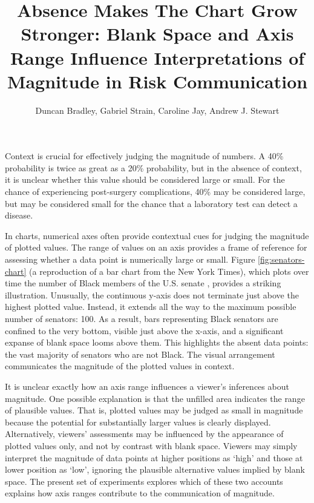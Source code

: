 \documentclass[journal]{vgtc}                %
\title{Absence Makes The Chart Grow Stronger: Blank Space and Axis Range Influence Interpretations of Magnitude in Risk Communication}
\author{Duncan Bradley, Gabriel Strain, Caroline Jay, Andrew J. Stewart}
\begin{document}


\maketitle


{Context is crucial for effectively judging the magnitude of numbers. A 40\% probability is twice as great as a 20\% probability, but in the absence of context, it is unclear whether this value should be considered large or small. For the chance of experiencing post-surgery complications, 40\% may be considered large, but may be considered small for the chance that a laboratory test can detect a disease.

In charts, numerical axes often provide contextual cues for judging the magnitude of plotted values. The range of values on an axis provides a frame of reference for assessing whether a data point is numerically large or small. Figure \ref{fig:senators-chart} (a reproduction of a bar chart from the New York Times), which plots over time the number of Black members of the U.S. senate \citep{history_art__archives_us_house_of_representatives_office_of_the_historian_black-american_nodate}, provides a striking illustration. Unusually, the continuous y-axis does not terminate just above the highest plotted value. Instead, it extends all the way to the maximum possible number of senators: 100. As a result, bars representing Black senators are confined to the very bottom, visible just above the x-axis, and a significant expanse of blank space looms above them. This highlights the absent data points: the vast majority of senators who are not Black. The visual arrangement communicates the magnitude of the plotted values in context.

It is unclear exactly how an axis range influences a viewer's inferences about magnitude. One possible explanation is that the unfilled area indicates the range of plausible values. That is, plotted values may be judged as small in magnitude because the potential for substantially larger values is clearly displayed. Alternatively, viewers' assessments may be influenced by the appearance of plotted values only, and not by contrast with blank space. Viewers may simply interpret the magnitude of data points at higher positions as `high' and those at lower position as `low', ignoring the plausible alternative values implied by blank space. The present set of experiments explores which of these two accounts explains how axis ranges contribute to the communication of magnitude.}
\end{document}
